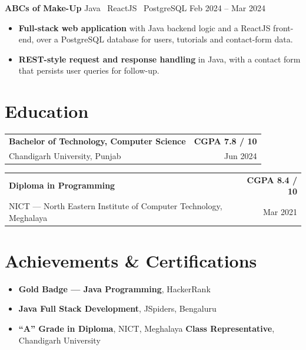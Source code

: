 \documentclass[a4paper,10pt]{article}
\makeatletter
\newcommand{\lead}[1]{{\color{ink}\bfseries #1}}
\newcommand{\project}[3]{%
  \vspace{3pt}%
  {\color{ink}\bfseries #1}%
  \hfill%
  {\color{muted}\small #2 \quad #3}%
  \par%
}
\newcommand{\edu}[4]{%
  \begin{tabularx}{\textwidth}{@{}X r@{}}
    {\color{ink}\bfseries #1} & {\color{ink}\bfseries #3} \\
    {\color{muted}\small #2}  & {\color{muted}\small #4} \\
  \end{tabularx}
  \vspace{3pt}%
}
\makeatother
\begin{document}
\project{ABCs of Make-Up}{Java \textperiodcentered\ ReactJS \textperiodcentered\ PostgreSQL}{Feb 2024 -- Mar 2024}
\begin{itemize}
  \item \lead{Full-stack web application} with Java backend logic and a ReactJS front-end, over a
    PostgreSQL database for users, tutorials and contact-form data.
  \item \lead{REST-style request and response handling} in Java, with a contact form that persists
    user queries for follow-up.
\end{itemize}

\section{Education}

\edu{Bachelor of Technology, Computer Science}{Chandigarh University, Punjab}{CGPA 7.8 / 10}{Jun 2024}
\edu{Diploma in Programming}{NICT — North Eastern Institute of Computer Technology, Meghalaya}{CGPA 8.4 / 10}{Mar 2021}

\section{Achievements \& Certifications}

\begin{itemize}
  \item \lead{Gold Badge — Java Programming}, HackerRank
  \item \lead{Java Full Stack Development}, JSpiders, Bengaluru
  \item \lead{``A'' Grade in Diploma}, NICT, Meghalaya \quad\textperiodcentered\quad
        \lead{Class Representative}, Chandigarh University
\end{itemize}
\end{document}
